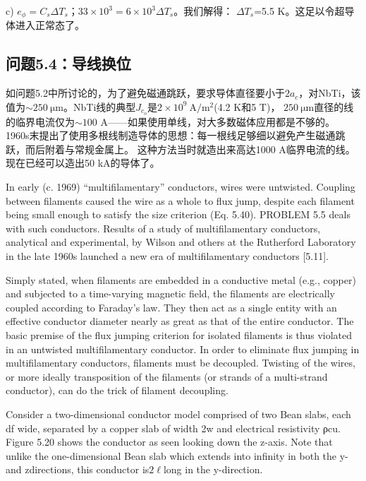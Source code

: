 c) $e_\phi = C_s \Delta T_s；33\times 10^3= 6\times 10^3 \Delta T_s$。我们解得：
$\Delta T_s$=5.5 K。这足以令超导体进入正常态了。


\subsection{问题5.4：导线换位}
如问题5.2中所讨论的，为了避免磁通跳跃，要求导体直径要小于$2a_c$，对NbTi，该值为$\sim 250\ \mathrm{\mu m}$。NbTi线的典型$J_{c_o}$是$2\times 10^9\ \mathrm{A/m^2}$(4.2 K和5 T)，
$250\ \mathrm{\mu m}$直径的线的临界电流仅为$\sim 100$ A——如果使用单线，对大多数磁体应用都是不够的。
1960s末提出了使用多根线制造导体的思想：每一根线足够细以避免产生磁通跳跃，而后附着与常规金属上。
这种方法当时就造出来高达1000 A临界电流的线。现在已经可以造出50 kA的导体了。

In early (c. 1969) “multifilamentary” conductors, wires were untwisted. Coupling
between filaments caused the wire as a whole to flux jump, despite each filament
being small enough to satisfy the size criterion (Eq. 5.40). PROBLEM 5.5 deals
with such conductors. Results of a study of multifilamentary conductors, analytical
and experimental, by Wilson and others at the Rutherford Laboratory in the late
1960s launched a new era of multifilamentary conductors [5.11].

Simply stated, when filaments are embedded in a conductive metal (e.g., copper)
and subjected to a time-varying magnetic field, the filaments are electrically coupled
according to Faraday’s law. They then act as a single entity with an effective
conductor diameter nearly as great as that of the entire conductor. The basic
premise of the flux jumping criterion for isolated filaments is thus violated in an
untwisted multifilamentary conductor. In order to eliminate flux jumping in multifilamentary
conductors, filaments must be decoupled. Twisting of the wires, or
more ideally transposition of the filaments (or strands of a multi-strand conductor),
can do the trick of filament decoupling.

Consider a two-dimensional conductor model comprised of two Bean slabs, each
df wide, separated by a copper slab of width 2w and electrical resistivity ρcu.
Figure 5.20 shows the conductor as seen looking down the z-axis. Note that unlike
the one-dimensional Bean slab which extends into infinity in both the y- and zdirections,
this conductor is$2\ell$long in the y-direction.

